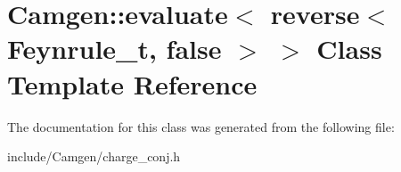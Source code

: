\hypertarget{a00179}{\section{Camgen\-:\-:evaluate$<$ reverse$<$ Feynrule\-\_\-t, false $>$ $>$ Class Template Reference}
\label{a00179}
}


The documentation for this class was generated from the following file\-:\begin{DoxyCompactItemize}
\item 
include/\-Camgen/charge\-\_\-conj.\-h\end{DoxyCompactItemize}
